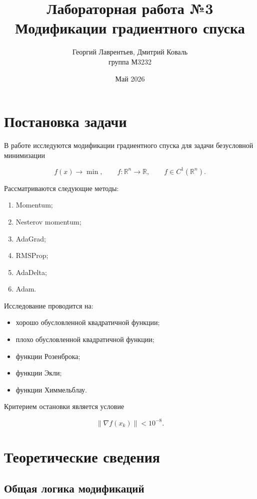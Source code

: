 \documentclass[a4paper,12pt]{article}
\title{
    \textbf{Лабораторная работа №3}\\
    Модификации градиентного спуска
}
\author{
    Георгий Лаврентьев, Дмитрий Коваль\\
    группа М3232
}
\date{Май 2026}
\newcommand{\R}{\mathbb{R}}
\newcommand{\grad}{\nabla}
\newcommand{\norm}[1]{\left\|#1\right\|}
\begin{document}
\maketitle
\vspace{-1em}

\section{Постановка задачи}

В работе исследуются модификации градиентного спуска
для задачи безусловной минимизации

\[
f(x)\to\min,
\qquad
f:\R^n\to\R,
\qquad
f\in C^1(\R^n).
\]

Рассматриваются следующие методы:

\begin{enumerate}
    \item Momentum;
    \item Nesterov momentum;
    \item AdaGrad;
    \item RMSProp;
    \item AdaDelta;
    \item Adam.
\end{enumerate}

Исследование проводится на:

\begin{itemize}
    \item хорошо обусловленной квадратичной функции;
    \item плохо обусловленной квадратичной функции;
    \item функции Розенброка;
    \item функции Экли;
    \item функции Химмельблау.
\end{itemize}

Критерием остановки является условие

\[
\norm{\grad f(x_k)} < 10^{-8}.
\]

\section{Теоретические сведения}

\subsection{Общая логика модификаций}
\end{document}
